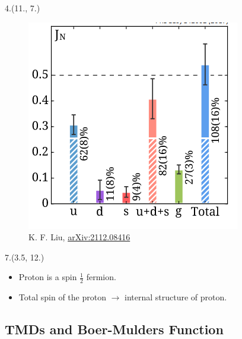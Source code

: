 \documentclass[12pt, xcolor={dvipsnames}, aspectratio = 169, sans, mathserif]{beamer}
\newenvironment{List}[2]
{\begin{textblock}{#1}#2
\begin{itemize}}
{\end{itemize}
\end{textblock}}
\newenvironment{Pic}[2]
{\begin{textblock}{#1}#2
\begin{figure}}
{\end{figure}
\end{textblock}}
\newcommand{\NewCaption}[3]{\caption{{#1}, \textcolor{blue}{\href{#2}{#3}}}}
\begin{document}
\begin{frame}
\begin{Pic}{4.}{(11., 7.)}
  \NewCaption{K. F. Liu}{https://arxiv.org/abs/2112.08416}{arXiv:2112.08416}
  \includegraphics[width=4.cm]{imgs/J_vbar_211.png}
\end{Pic}

\begin{List}{7.}{(3.5, 12.)}

  \item Proton is a spin $\frac{1}{2}$ fermion.

  \item Total spin of the proton $\rightarrow$ internal structure of proton.

\end{List}

\end{frame}

\subsection{TMDs and Boer-Mulders Function}
\end{document}

